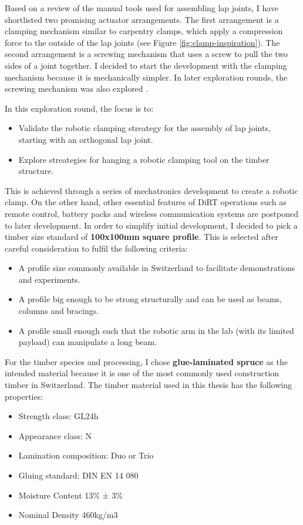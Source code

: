 Based on a review of the manual tools used for assembling lap joints, I have shortlisted two promising actuator arrangements. The first arrangement is a clamping mechanism similar to carpentry clamps, which apply a compression force to the outside of the lap joints (see Figure \ref{fig:clamp-inspiration}). The second arrangement is a screwing mechanism that uses a screw to pull the two sides of a joint together. I decided to start the development with the clamping mechanism because it is mechanically simpler. In later exploration rounds, the screwing mechanism was also explored .

In this exploration round, the focus is to:
\begin{itemize}
    \item Validate the robotic clamping streategy for the assembly of lap joints, starting with an orthogonal lap joint.
    \item Explore streategies for hanging a robotic clamping tool on the timber structure.
\end{itemize}

This is achieved through a series of mechatronics development to create a robotic clamp. On the other hand, other essential features of DiRT operations such as remote control, battery packs and wireless communication systems are postponed to later development.
In order to simplify initial development, I decided to pick a timber size standard of \textbf{100x100mm square profile}. This is selected after careful consideration to fulfil the following criteria:
\begin{itemize}[nosep]
    \item A profile size commonly available in Switzerland to facilitate demonstrations and experiments.
    \item A profile big enough to be strong structurally and can be used as beams, columns and bracings.
    \item A profile small enough such that the robotic arm in the lab (with its limited payload) can manipulate a long beam.
\end{itemize}

For the timber species and processing, I chose \textbf{glue-laminated spruce} as the intended material because it is one of the most commonly used construction timber in Switzerland. The timber material used in this thesis has the following properties:

\begin{itemize}[nosep]
    \item Strength class: GL24h 
    \item Appearance class: N
    \item Lamination composition: Duo or Trio
    \item Gluing standard: DIN EN 14 080 
    \item Moisture Content 13\% ± 3\%
    \item Nominal Density 460kg/m3
\end{itemize}

